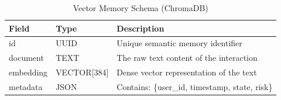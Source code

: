 \begin{table}[H]
\centering
\caption{Vector Memory Schema (ChromaDB)}
\label{tab:memory_schema}
\begin{tabular}{|p{3cm}|p{3cm}|p{9cm}|}
\hline
Field & Type & Description \\ \hline
id & UUID & Unique semantic memory identifier \\ 
document & TEXT & The raw text content of the interaction \\ 
embedding & VECTOR[384] & Dense vector representation of the text \\ 
metadata & JSON & Contains: \{user\_id, timestamp, state, risk\} \\ 
\hline
\end{tabular}
\end{table}
